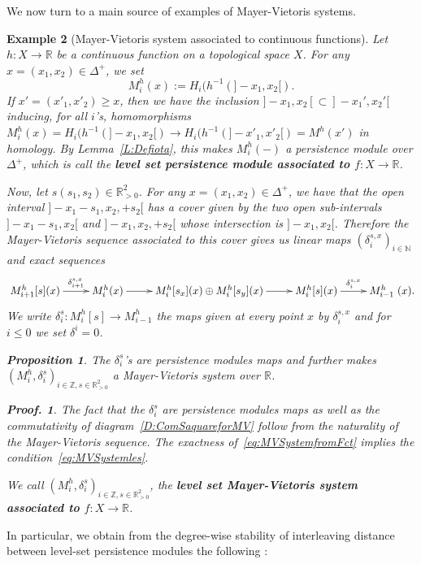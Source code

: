 \documentclass[a4paper, english, 11pt]{article}
\newcommand{\0}{\vec{0}}
\newcommand{\R}[0]{\mathbb{R}}
\newcommand{\N}[0]{\mathbb{N}}
\newcommand{\Z}[0]{\mathbb{Z}}
\newtheorem{prop}{Proposition}[section]
\newtheorem*{pf}{Proof.} }
\newtheorem{ex}[prop]{Example}
\begin{document}
We now turn to a main source of examples of Mayer-Vietoris systems. 
\begin{ex}[Mayer-Vietoris system associated to continuous functions]\label{Ex:MVfromFct}
Let $h: X\to \R$ be a continuous function on a topological space $X$. For any $
x=(x_1,x_2)\in \Delta^+$, we 
 set $$M_i^h(x):= H_i(h^{-1}(]-x_1, x_2[).$$
 If $x'=(x'_1, x'_2)\geq x$, then we have the inclusion $]-x_1, x_2[\subset ]-x_1', x_2'[$ inducing, for all $i$'s, homomorphisms $M_i^h(x)=H_i(h^{-1}(]-x_1, x_2[) \to H_i(h^{-1}(]-x'_1, x'_2[)= M^h(x')$ in homology. 
 By Lemma~\ref{L:Defiota}, this makes $M_i^h(-)$ a persistence module over $\Delta^+$, which is call the \textbf{level set persistence module associated to $f:X\to \R$}. 
 
 \smallskip
 
 Now, let $s(s_1,s_2) \in \R^2_{>0}$. For any $x=(x_1,x_2)\in \Delta^+$, we have that the open interval $]-x_1-s_1, x_2,+s_2[ $ has a cover given by the two open sub-intervals $]-x_1-s_1, x_2[$ and $]-x_1, x_2,+s_2[ $ whose intersection is $]-x_1, x_2[$. Therefore the Mayer-Vietoris sequence associated to this cover gives us linear maps $(\delta_{i}^{s,x})_{i\in \N}$ and exact sequences 
  \begin{equation}\xymatrix{M^h_{i+1}[s](x) \ar[r]^-{\delta_{i+1}^{s,x}} & M^h_i(x) \ar[r] & M^h_i[s_x](x) \oplus M^h_i[s_y](x) \ar[r] & M^h_i[s](x) \ar[r]^-{\delta_{i}^{s,x}} & M^h_{i-1}}(x).\label{eq:MVSystemfromFct}\end{equation}
  We write $\delta^s_i: M_i^h[s] \to M_{i-1}^h$ the maps given at every point $x$ by $\delta_i^{s,x}$ and for $i\leq 0$ we set $\delta^i=0$.
  \begin{prop}\label{P:MVfromFct}
  The  $\delta^s_i$'s are persistence modules maps and further makes $(M^h_i, \delta^s_i)_{i\in \Z, s\in \R^2_{>0}}$ a Mayer-Vietoris system over $\R$.
  \end{prop}
  \begin{pf}
  The fact that the $\delta^s_i$ are persistence modules maps as well as the commutativity of diagram~\eqref{D:ComSaquareforMV} follow from the naturality of the Mayer-Vietoris sequence. The exactness of~\eqref{eq:MVSystemfromFct} implies the condition~\eqref{eq:MVSystemles}.
  \end{pf}
  We call  $(M^h_i, \delta^s_i)_{i\in \Z, s\in \R^2_{>0}}$, the \textbf{level set Mayer-Vietoris system associated to $f:X\to \R$}. 
\end{ex}


In particular, we obtain from the degree-wise stability of interleaving distance between level-set persistence modules the following : 
\end{document}
